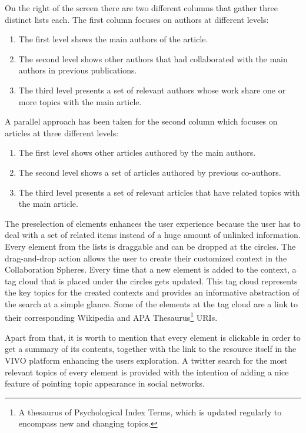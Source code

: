 On the right of the screen there are two different columns that gather three distinct lists each. The first column focuses on authors at different levels: 
\begin{enumerate}
  \item The first level shows the main authors of the article.
  \item The second level shows other authors that had collaborated with the main authors in previous publications.
  \item The third level presents a set of relevant authors whose work share one or more topics with the main article.
\end{enumerate}
A parallel approach has been taken for the second column which focuses on articles at three different levels:
\begin{enumerate}
  \item The first level shows other articles authored by the main authors.
  \item The second level shows  a set of articles authored by previous co-authors.
  \item The third level presents a set of relevant articles that have related topics with the main article.
\end{enumerate}  
The preselection of elements enhances the user experience because the user has to deal with a set of related items instead of a huge amount of unlinked information. Every element from the lists is draggable and can be dropped at the circles. The drag-and-drop action allows the user to create their customized context in the Collaboration Spheres.
Every time that a new element is added to the context, a tag cloud that is placed under the circles gets updated. This tag cloud represents the key topics for the created contexts and provides an informative abstraction of the search at a simple glance. Some of the elements at the tag cloud are a link to their corresponding Wikipedia and APA Thesaurus\footnote{A thesaurus of Psychological Index Terms, which is updated regularly to encompass new and changing topics.} URIs.

Apart from that, it is worth to mention that every element is clickable in order to get a summary of its contents, together with the link to the resource itself in the VIVO platform enhancing the users exploration. A twitter search for the most relevant topics of every element is provided with the intention of adding a nice feature of pointing topic appearance in social networks.\\



